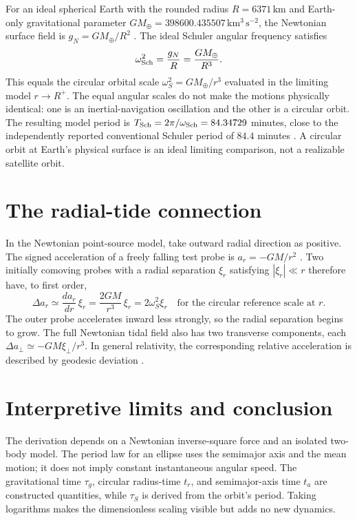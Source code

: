 \documentclass[12pt]{article}
\begin{document}
For an ideal spherical Earth with the rounded radius $R=6371\,\mathrm{km}$ and Earth-only gravitational parameter $GM_{\oplus}=398600.435507\,\mathrm{km^3\,s^{-2}}$, the Newtonian surface field is $g_N=GM_{\oplus}/R^2$ \cite{NSSDCEarth,JPLParameters}. The ideal Schuler angular frequency satisfies
\begin{equation}
  \omega_{\rm Sch}^2=\frac{g_N}{R}=\frac{GM_{\oplus}}{R^3}.
  \label{eq:schuler-scale}
\end{equation}
This equals the circular orbital scale $\omega_S^2=GM_{\oplus}/r^3$ evaluated in the limiting model $r\to R^+$. The equal angular scales do not make the motions physically identical: one is an inertial-navigation oscillation and the other is a circular orbit. The resulting model period is $T_{\rm Sch}=2\pi/\omega_{\rm Sch}=84.34729$ minutes, close to the independently reported conventional Schuler period of $84.4$ minutes \cite{OliverGower}. A circular orbit at Earth's physical surface is an ideal limiting comparison, not a realizable satellite orbit.

\section{The radial-tide connection}
\label{sec:tide}

In the Newtonian point-source model, take outward radial direction as positive. The signed acceleration of a freely falling test probe is $a_r=-GM/r^2$ \cite{Fitzpatrick}. Two initially comoving probes with a radial separation $\xi_r$ satisfying $|\xi_r|\ll r$ therefore have, to first order,
\begin{equation}
  \Delta a_r\simeq\frac{da_r}{dr}\,\xi_r
  =\frac{2GM}{r^3}\,\xi_r
  =2\omega_S^2\xi_r
  \quad\text{for the circular reference scale at }r.
  \label{eq:tidal-separation}
\end{equation}
The outer probe accelerates inward less strongly, so the radial separation begins to grow. The full Newtonian tidal field also has two transverse components, each $\Delta a_\perp\simeq-GM\xi_\perp/r^3$. In general relativity, the corresponding relative acceleration is described by geodesic deviation \cite{OregonTides}.

\section{Interpretive limits and conclusion}
\label{sec:limits}

The derivation depends on a Newtonian inverse-square force and an isolated two-body model. The period law for an ellipse uses the semimajor axis and the mean motion; it does not imply constant instantaneous angular speed. The gravitational time $\tau_g$, circular radius-time $t_r$, and semimajor-axis time $t_a$ are constructed quantities, while $\tau_S$ is derived from the orbit's period. Taking logarithms makes the dimensionless scaling visible but adds no new dynamics.
\end{document}
